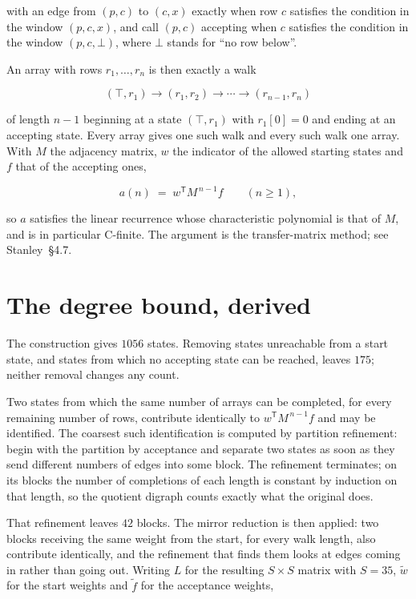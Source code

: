 \documentclass[11pt]{article}
\theoremstyle{definition}
\begin{document}
with an edge from $(p,c)$ to $(c,x)$ exactly when row $c$ satisfies the condition in the window $(p,c,x)$, and call $(p,c)$ accepting when $c$ satisfies the condition in the window $(p,c,\bot)$, where $\bot$ stands for ``no row below''.

An array with rows $r_1,\dots,r_n$ is then exactly a walk

\[(\top,r_1) \to (r_1,r_2) \to \cdots \to (r_{n-1},r_n)\]

of length $n-1$ beginning at a state $(\top,r_1)$ with $r_1[0]=0$ and ending at an accepting state. Every array gives one such walk and every such walk one array. With $M$ the adjacency matrix, $w$ the indicator of the allowed starting states and $f$ that of the accepting ones,

\[a(n) \;=\; w^{\mathsf T} M^{\,n-1} f \qquad (n \ge 1),\]

so $a$ satisfies the linear recurrence whose characteristic polynomial is that of $M$, and is in particular C-finite. The argument is the transfer-matrix method; see Stanley~\S4.7.

\section{The degree bound, derived}

The construction gives $1056$ states. Removing states unreachable from a start state, and states from which no accepting state can be reached, leaves $175$; neither removal changes any count.

Two states from which the same number of arrays can be completed, for every remaining number of rows, contribute identically to $w^{\mathsf T}M^{\,n-1}f$ and may be identified. The coarsest such identification is computed by partition refinement: begin with the partition by acceptance and separate two states as soon as they send different numbers of edges into some block. The refinement terminates; on its blocks the number of completions of each length is constant by induction on that length, so the quotient digraph counts exactly what the original does.

That refinement leaves $42$ blocks. The mirror reduction is then applied: two blocks receiving the same weight from the start, for every walk length, also contribute identically, and the refinement that finds them looks at edges coming in rather than going out. Writing $L$ for the resulting $S \times S$ matrix with $S = 35$, $\tilde w$ for the start weights and $\tilde f$ for the acceptance weights,
\end{document}
